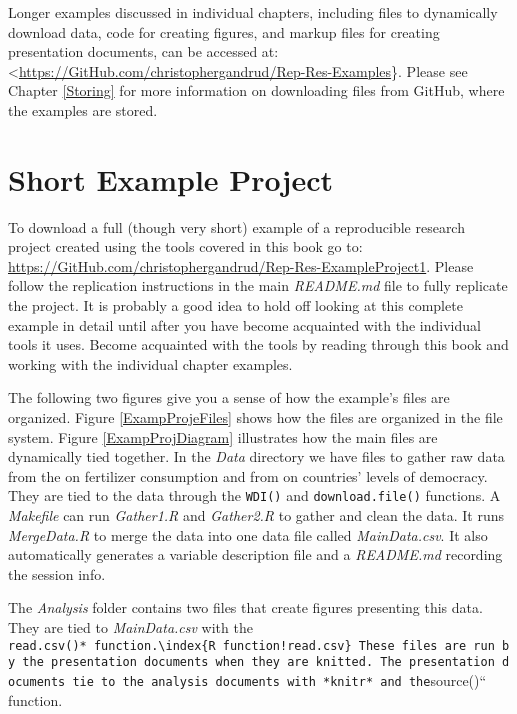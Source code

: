 \documentclass[]{krantz}
\theoremstyle{definition}
\theoremstyle{definition}
\theoremstyle{definition}
\theoremstyle{remark}
\begin{document}
Longer examples discussed in individual chapters, including files to
dynamically download data, code for creating figures, and markup files
for creating presentation documents, can be accessed at:
\textless{}\url{https://GitHub.com/christophergandrud/Rep-Res-Examples}\}.
Please see Chapter \ref{Storing} for more information on downloading
files from GitHub, where the examples are stored.

\hypertarget{short-example-project}{%
\section*{Short Example Project}\label{short-example-project}}


To download a full (though very short) example of a reproducible
research project created using the tools covered in this book go to:
\url{https://GitHub.com/christophergandrud/Rep-Res-ExampleProject1}.
Please follow the replication instructions in the main \emph{README.md}
file to fully replicate the project. It is probably a good idea to hold
off looking at this complete example in detail until after you have
become acquainted with the individual tools it uses. Become acquainted
with the tools by reading through this book and working with the
individual chapter examples.

The following two figures give you a sense of how the example's files
are organized. Figure \ref{ExampProjeFiles} shows how the files are
organized in the file system. Figure \ref{ExampProjDiagram} illustrates
how the main files are dynamically tied together. In the \emph{Data}
directory we have files to gather raw data from the \cite{WorldBank2013}
on fertilizer consumption and from \cite{Pemstein2010} on countries'
levels of democracy. They are tied to the data through the
\texttt{WDI()} and \texttt{download.file()}
functions. A
\emph{Makefile} can run \emph{Gather1.R} and
\emph{Gather2.R} to gather and clean the data. It runs
\emph{MergeData.R} to merge the data into one data file called
\emph{MainData.csv}. It also automatically generates a variable
description file and a \emph{README.md} recording the
session info.

The \emph{Analysis} folder contains two files that create figures
presenting this data. They are tied to \emph{MainData.csv} with the
\texttt{read.csv()*\ function.\textbackslash{}index\{R\ function!read.csv\}\ These\ files\ are\ run\ by\ the\ presentation\ documents\ when\ they\ are\ knitted.\ The\ presentation\ documents\ tie\ to\ the\ analysis\ documents\ with\ *knitr*\ and\ the}source()``
function.
\end{document}
